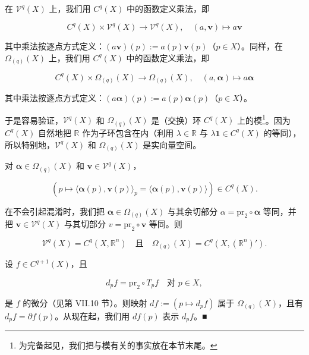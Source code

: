 \begin{remark}
在 $ \mathcal{V}^{q}(X) $ 上，我们用 $ C^{q}(X) $ 中的函数定义乘法，即

\[
C^{q}(X) \times \mathcal{V}^{q}(X) \to \mathcal{V}^{q}(X) , \quad (a,\boldsymbol{v}) \mapsto a\boldsymbol{v}
\]

其中乘法按逐点方式定义：$ (a\boldsymbol{v})(p) := a(p)\boldsymbol{v}(p) $（$ p \in X $）。同样，在 $ \Omega_{(q)}(X) $ 上，我们用 $ C^{q}(X) $ 中的函数定义乘法，即

\[
C^{q}(X) \times \Omega_{(q)}(X) \to \Omega_{(q)}(X) , \quad (a,\boldsymbol{\alpha}) \mapsto a\boldsymbol{\alpha}
\]

其中乘法按逐点方式定义：$ (a\boldsymbol{\alpha})(p) := a(p)\boldsymbol{\alpha}(p) $（$ p \in X $）。

于是容易验证，$ \mathcal{V}^{q}(X) $ 和 $ \Omega_{(q)}(X) $ 是（交换）环 $ C^{q}(X) $ 上的模\footnote{为完备起见，我们把与模有关的事实放在本节末尾。}。因为 $ C^{q}(X) $ 自然地把 $ \mathbb{R} $ 作为子环包含在内（利用 $ \lambda \in \mathbb{R} $ 与 $ \lambda\mathbf{1} \in C^{q}(X) $ 的等同），所以特别地，$ \mathcal{V}^{q}(X) $ 和 $ \Omega_{(q)}(X) $ 是实向量空间。

\end{remark}

\begin{remark}

\begin{items}
\item

对 $ \boldsymbol{\alpha} \in \Omega_{(q)}(X) $ 和 $ \boldsymbol{v} \in \mathcal{V}^{q}(X) $，

\[
\left(p \mapsto \langle\boldsymbol{\alpha}(p),\boldsymbol{v}(p)\rangle_{p} = \langle\boldsymbol{\alpha}(p),\boldsymbol{v}(p)\rangle\right) \in C^{q}(X) .
\]
\item

在不会引起混淆时，我们把 $ \boldsymbol{\alpha} \in \Omega_{(q)}(X) $ 与其余切部分 $ \alpha = \mathrm{pr}_{2} \circ \boldsymbol{\alpha} $ 等同，并把 $ \boldsymbol{v} \in \mathcal{V}^{q}(X) $ 与其切部分 $ v = \mathrm{pr}_{2} \circ \boldsymbol{v} $ 等同。则

\[
\mathcal{V}^{q}(X) = C^{q}(X,\mathbb{R}^{n}) \quad \text{且} \quad \Omega_{(q)}(X) = C^{q}\left(X,(\mathbb{R}^{n})'\right) .
\]
\item

设 $ f \in C^{q+1}(X) $，且

\[
d_{p}f = \mathrm{pr}_{2} \circ T_{p}f \quad \text{对 } p \in X ,
\]

是 $ f $ 的微分（见第 VII.10 节）。则映射 $ df := (p \mapsto d_{p}f) $ 属于 $ \Omega_{(q)}(X) $，且有 $ d_{p}f = \partial f(p) $。从现在起，我们用 $ df(p) $ 表示 $ d_{p}f $。\nobreak\hspace{0.35em}■

\end{items}

\end{remark}

